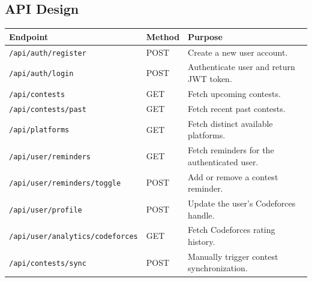 \documentclass[12pt,a4paper]{report}
\begin{document}
\begin{normalsize}
\section{API Design}

\begin{center}
\begin{tabular}{|p{4.2cm}|p{2.2cm}|p{7cm}|}
\hline
\textbf{Endpoint} & \textbf{Method} & \textbf{Purpose} \\
\hline
\texttt{/api/auth/register} & POST & Create a new user account. \\
\hline
\texttt{/api/auth/login} & POST & Authenticate user and return JWT token. \\
\hline
\texttt{/api/contests} & GET & Fetch upcoming contests. \\
\hline
\texttt{/api/contests/past} & GET & Fetch recent past contests. \\
\hline
\texttt{/api/platforms} & GET & Fetch distinct available platforms. \\
\hline
\texttt{/api/user/reminders} & GET & Fetch reminders for the authenticated user. \\
\hline
\texttt{/api/user/reminders/toggle} & POST & Add or remove a contest reminder. \\
\hline
\texttt{/api/user/profile} & POST & Update the user's Codeforces handle. \\
\hline
\texttt{/api/user/analytics/codeforces} & GET & Fetch Codeforces rating history. \\
\hline
\texttt{/api/contests/sync} & POST & Manually trigger contest synchronization. \\
\hline
\end{tabular}
\end{center}

\end{normalsize}
\end{document}
